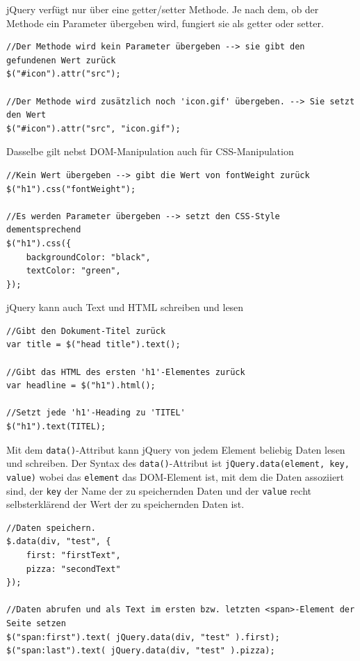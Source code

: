 \documentclass[a4paper, 11pt]{article}
\newcommand{\code}[1]{\texttt{#1}}
\begin{document}
\vspace{10px}

\noindent jQuery verfügt nur über eine getter/setter Methode. Je nach dem, ob der Methode ein Parameter übergeben wird, fungiert sie als getter oder setter.

\begin{lstlisting}
//Der Methode wird kein Parameter übergeben --> sie gibt den gefundenen Wert zurück
$("#icon").attr("src");

//Der Methode wird zusätzlich noch 'icon.gif' übergeben. --> Sie setzt den Wert
$("#icon").attr("src", "icon.gif");
\end{lstlisting}

\noindent Dasselbe gilt nebst DOM-Manipulation auch für CSS-Manipulation
\begin{lstlisting}
//Kein Wert übergeben --> gibt die Wert von fontWeight zurück
$("h1").css("fontWeight");

//Es werden Parameter übergeben --> setzt den CSS-Style dementsprechend
$("h1").css({
	backgroundColor: "black",
	textColor: "green",
});
\end{lstlisting}

\noindent jQuery kann auch Text und HTML schreiben und lesen
\begin{lstlisting}
//Gibt den Dokument-Titel zurück
var title = $("head title").text();

//Gibt das HTML des ersten 'h1'-Elementes zurück
var headline = $("h1").html();

//Setzt jede 'h1'-Heading zu 'TITEL'
$("h1").text(TITEL);
\end{lstlisting}

\noindent Mit dem \code{data()}-Attribut kann jQuery von jedem Element beliebig Daten lesen und schreiben. Der Syntax des \code{data()}-Attribut ist \code{jQuery.data(element, key, value)} wobei das \code{element} das DOM-Element ist, mit dem die Daten assoziiert sind, der \code{key} der Name der zu speichernden Daten und der \code{value} recht selbsterklärend der Wert der zu speichernden Daten ist.
\begin{lstlisting}
//Daten speichern.
$.data(div, "test", {
	first: "firstText",
	pizza: "secondText"
});

//Daten abrufen und als Text im ersten bzw. letzten <span>-Element der Seite setzen
$("span:first").text( jQuery.data(div, "test" ).first);
$("span:last").text( jQuery.data(div, "test" ).pizza);
\end{lstlisting}
\end{document}
